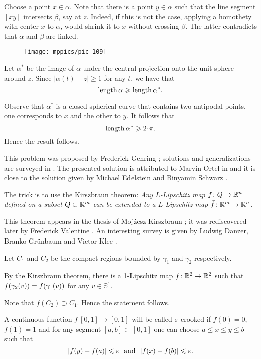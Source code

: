 Choose a point $x\in\alpha$. 
Note that there is a point $y\in\alpha$ such that the line segment 
$[xy]$ intersects $\beta$, say at $z$. 
Indeed, if this is not the case, 
applying a homothety with center $x$ to $\alpha$, would shrink it to $x$ without crossing $\beta$.
The latter contradicts that $\alpha$ and $\beta$ are linked. 

\begin{wrapfigure}{r}{26 mm}
\vskip-2mm
\centering
\texttt{[image: mppics/pic-109]}
\end{wrapfigure}

Let $\alpha^{*}$ be the image of $\alpha$ under the central projection onto the unit sphere around $z$.
Since $|\alpha(t)-z|\ge1$ for any $t$, we have that
$$\operatorname{\rm length} \alpha\geqslant \operatorname{\rm length}\alpha^{*}.$$

Observe that $\alpha^{*}$ is a closed spherical curve that contains two antipodal points,
one corresponds to $x$ and the other to $y$.
It follows that
$$\length \alpha^{*}\ge 2\cdot\pi.$$
Hence the result follows.\qeds



This problem was proposed by Frederick Gehring \cite[see 7.22 in][]{gehring};
solutions and generalizations are surveyed in \cite{mateljevic}. 
The presented solution is attributed to Marvin Ortel in \cite{CJKSW} and it is close to the solution given by Michael Edelstein and Binyamin Schwarz \cite{edelstein-schwatz}.

 The trick is to use the Kirszbraun theorem:
\emph{Any $L$-Lipschitz  map $f\colon Q\to \mathbb{R}^n$ defined on a subset $Q\subset \mathbb{R}^m$ can be extended to a $L$-Lipschitz  map $\bar f\colon\mathbb{R}^m\to \mathbb{R}^n$.}

This theorem  appears in the thesis of Mojżesz Kirszbraun \cite[][]{kirszbraun};
it was rediscovered later by Frederick Valentine \cite[][]{valentine}.
An interesting survey is given by 
Ludwig Danzer, Branko Grünbaum and Victor Klee \cite[][]{danzer-grunbaum-klee}.

\medskip

Let $C_1$ and $C_2$ be the compact regions bounded by $\gamma_1$ and $\gamma_2$ respectively.

By the Kirszbraun theorem, there is a 1-Lipschitz map $f\colon\mathbb{R}^2\to\mathbb{R}^2$ 
such that $f(\gamma_2(v))\z=f(\gamma_1(v))$ for any $v\in\mathbb S^1$.

Note that $f(C_2)\supset C_1$.
Hence the statement follows.\qeds

A continuous function $f\:[0,1]\to [0,1]$
will be called $\varepsilon$-crooked 
if $f(0)=0$, $f(1)=1$ 
and for any segment $[a,b]\subset [0,1]$ 
one can choose $a\le x\le y\le b$ 
such that
\[|f(y)-f(a)|\le\eps\ \ \text{and}\ \ |f(x)-f(b)|\le\eps.\]

